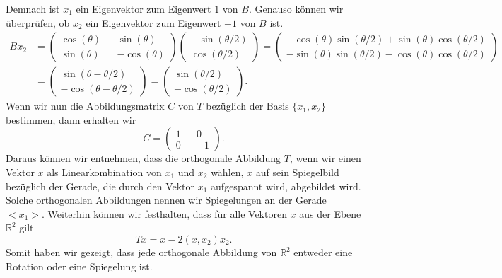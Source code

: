 Demnach ist $x_1$ ein Eigenvektor zum Eigenwert $1$ von $B$. Genauso können wir überprüfen, ob $x_2$ ein Eigenvektor zum Eigenwert $-1$ von $B$ ist.
\begin{align*}
	Bx_2 &= \begin{pmatrix}
		\cos(\theta) && \sin(\theta) \\
		\sin(\theta) && -\cos(\theta)
	\end{pmatrix} \begin{pmatrix}
		-\sin(\theta/2) \\
		\cos(\theta/2)
	\end{pmatrix} = \begin{pmatrix}
		-\cos(\theta)\sin(\theta/2)+\sin(\theta)\cos(\theta/2) \\
		-\sin(\theta)\sin(\theta/2)-\cos(\theta)\cos(\theta/2)
	\end{pmatrix} \\ &= \begin{pmatrix}
		\sin(\theta - \theta/2) \\
		-\cos(\theta - \theta/2)
	\end{pmatrix} = \begin{pmatrix}
		\sin(\theta/2) \\
		-\cos(\theta/2)
	\end{pmatrix}.
\end{align*}
Wenn wir nun die Abbildungsmatrix $C$ von $T$ bezüglich der Basis $\{x_1,x_2\}$ bestimmen, dann erhalten wir
$$C = \begin{pmatrix}
	1 && 0 \\
	0 && -1
\end{pmatrix}.$$
Daraus können wir entnehmen, dass die orthogonale Abbildung $T$, wenn wir einen Vektor $x$ als Linearkombination von $x_1$ und $x_2$ wählen, $x$ auf sein Spiegelbild bezüglich der Gerade, die durch den Vektor $x_1$ aufgespannt wird, abgebildet wird. Solche orthogonalen Abbildungen nennen wir Spiegelungen an der Gerade $<x_1>$. Weiterhin können wir festhalten, dass für alle Vektoren $x$ aus der Ebene $\mathbb{R}^2$ gilt
$$Tx = x - 2(x,x_2)x_2.$$
Somit haben wir gezeigt, dass jede orthogonale Abbildung von $\mathbb{R}^2$ entweder eine Rotation oder eine Spiegelung ist.
